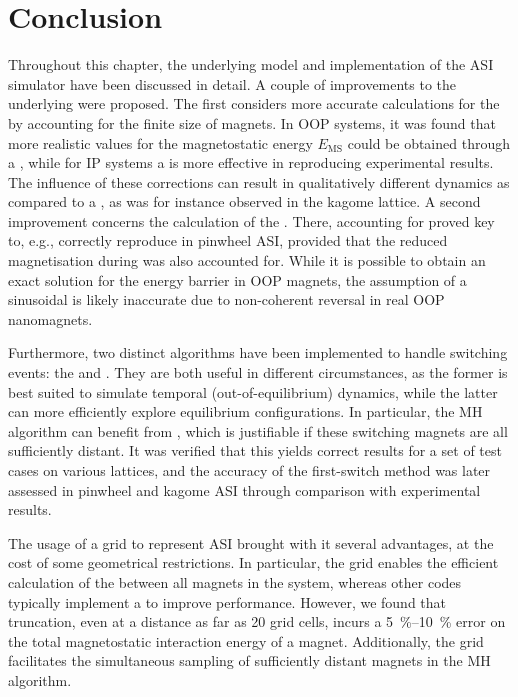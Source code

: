 \newpage
\section{Conclusion}
Throughout this chapter, the underlying model and implementation of the \hotspice ASI simulator have been discussed in detail.
A couple of improvements to the underlying  were proposed.
The first considers more accurate calculations for the  by accounting for the finite size of magnets.
In OOP systems, it was found that more realistic values for the magnetostatic energy $E_\mathrm{MS}$ could be obtained through a , while for IP systems a  is more effective in reproducing experimental results.
The influence of these corrections can result in qualitatively different dynamics as compared to a , as was for instance observed in the kagome lattice.
A second improvement concerns the calculation of the .
There, accounting for  proved key to, e.g., correctly reproduce  in pinwheel ASI, provided that the reduced magnetisation during  was also accounted for.
While it is possible to obtain an exact solution for the energy barrier in OOP magnets, the assumption of a sinusoidal  is likely inaccurate due to non-coherent reversal in real OOP nanomagnets. \par
Furthermore, two distinct algorithms have been implemented to handle switching events: the  and .
They are both useful in different circumstances, as the former is best suited to simulate temporal (out-of-equilibrium) dynamics, while the latter can more efficiently explore equilibrium configurations.
In particular, the MH algorithm can benefit from , which is justifiable if these switching magnets are all sufficiently distant.
It was verified that this yields correct results for a set of test cases on various lattices, and the accuracy of the first-switch method was later assessed in pinwheel and kagome ASI through comparison with experimental results. \par
The usage of a grid to represent ASI brought with it several advantages, at the cost of some geometrical restrictions.
In particular, the grid enables the efficient calculation of the  between all magnets in the system, whereas other codes typically implement a  to improve performance.
However, we found that truncation, even at a distance as far as 20 grid cells, incurs a \SIrange{5}{10}{\percent} error on the total magnetostatic interaction energy of a magnet.
Additionally, the grid facilitates the simultaneous sampling of sufficiently distant magnets in the MH algorithm. \\\par

